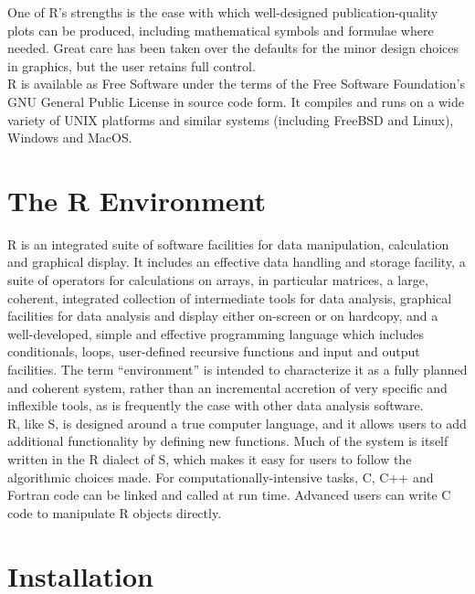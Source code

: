 One of R’s strengths is the ease with which well-designed publication-quality plots can be produced, including mathematical symbols and formulae where needed. Great care has been taken over the defaults for the minor design choices in graphics, but the user retains full control. \\

R is available as Free Software under the terms of the Free Software Foundation’s GNU General Public License in source code form. It compiles and runs on a wide variety of UNIX platforms and similar systems (including FreeBSD and Linux), Windows and MacOS. \\

\section{The R Environment}

R is an integrated suite of software facilities for data manipulation, calculation and graphical display. It includes
an effective data handling and storage facility, a suite of operators for calculations on arrays, in particular matrices, a large, coherent, integrated collection of intermediate tools for data analysis, graphical facilities for data analysis and display either on-screen or on hardcopy, and a well-developed, simple and effective programming language which includes conditionals, loops, user-defined recursive functions and input and output facilities.
The term “environment” is intended to characterize it as a fully planned and coherent system, rather than an incremental accretion of very specific and inflexible tools, as is frequently the case with other data analysis software. \\

R, like S, is designed around a true computer language, and it allows users to add additional functionality by defining new functions. Much of the system is itself written in the R dialect of S, which makes it easy for users to follow the algorithmic choices made. For computationally-intensive tasks, C, C++ and Fortran code can be linked and called at run time. Advanced users can write C code to manipulate R objects directly. \\


\section{Installation}


